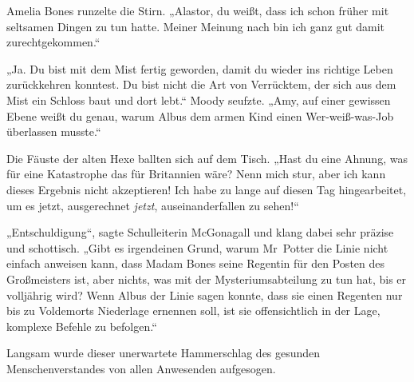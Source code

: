 Amelia Bones runzelte die Stirn.
„Alastor, du weißt, dass ich schon früher mit seltsamen Dingen zu tun hatte. Meiner Meinung nach bin ich ganz gut damit zurechtgekommen.“

„Ja. Du bist mit dem Mist fertig geworden, damit du wieder ins richtige Leben zurückkehren konntest. Du bist nicht die Art von Verrücktem, der sich aus dem Mist ein Schloss baut und dort lebt.“
Moody seufzte.
„Amy, auf einer gewissen Ebene weißt du genau, warum Albus dem armen Kind einen Wer-weiß-was-Job überlassen musste.“

Die Fäuste der alten Hexe ballten sich auf dem Tisch.
„Hast du eine Ahnung, was für eine Katastrophe das für Britannien wäre? Nenn mich stur, aber ich kann dieses Ergebnis nicht akzeptieren! Ich habe zu lange auf diesen Tag hingearbeitet, um es jetzt, ausgerechnet \emph{jetzt}, auseinanderfallen zu sehen!“

„Entschuldigung“, sagte Schulleiterin McGonagall und klang dabei sehr präzise und schottisch.
„Gibt es irgendeinen Grund, warum Mr~Potter die Linie nicht einfach anweisen kann, dass Madam Bones seine Regentin für den Posten des Großmeisters ist, aber nichts, was mit der Mysteriumsabteilung zu tun hat, bis er volljährig wird? Wenn Albus der Linie sagen konnte, dass sie einen Regenten nur bis zu Voldemorts Niederlage ernennen soll, ist sie offensichtlich in der Lage, komplexe Befehle zu befolgen.“

Langsam wurde dieser unerwartete Hammerschlag des gesunden Menschenverstandes von allen Anwesenden aufgesogen.

